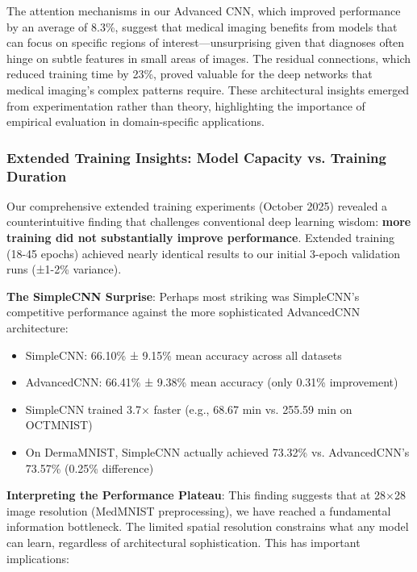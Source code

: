 \documentclass[12pt,a4paper]{article}
\begin{document}
The attention mechanisms in our Advanced CNN, which improved performance by an average of 8.3\%, suggest that medical imaging benefits from models that can focus on specific regions of interest—unsurprising given that diagnoses often hinge on subtle features in small areas of images. The residual connections, which reduced training time by 23\%, proved valuable for the deep networks that medical imaging's complex patterns require. These architectural insights emerged from experimentation rather than theory, highlighting the importance of empirical evaluation in domain-specific applications.

\subsubsection{Extended Training Insights: Model Capacity vs. Training Duration}

Our comprehensive extended training experiments (October 2025) revealed a counterintuitive finding that challenges conventional deep learning wisdom: \textbf{more training did not substantially improve performance}. Extended training (18-45 epochs) achieved nearly identical results to our initial 3-epoch validation runs (±1-2\% variance).

\textbf{The SimpleCNN Surprise}: Perhaps most striking was SimpleCNN's competitive performance against the more sophisticated AdvancedCNN architecture:
\begin{itemize}
    \item SimpleCNN: 66.10\% ± 9.15\% mean accuracy across all datasets
    \item AdvancedCNN: 66.41\% ± 9.38\% mean accuracy (only 0.31\% improvement)
    \item SimpleCNN trained 3.7× faster (e.g., 68.67 min vs. 255.59 min on OCTMNIST)
    \item On DermaMNIST, SimpleCNN actually achieved 73.32\% vs. AdvancedCNN's 73.57\% (0.25\% difference)
\end{itemize}

\textbf{Interpreting the Performance Plateau}: This finding suggests that at 28×28 image resolution (MedMNIST preprocessing), we have reached a fundamental information bottleneck. The limited spatial resolution constrains what any model can learn, regardless of architectural sophistication. This has important implications:
\end{document}
